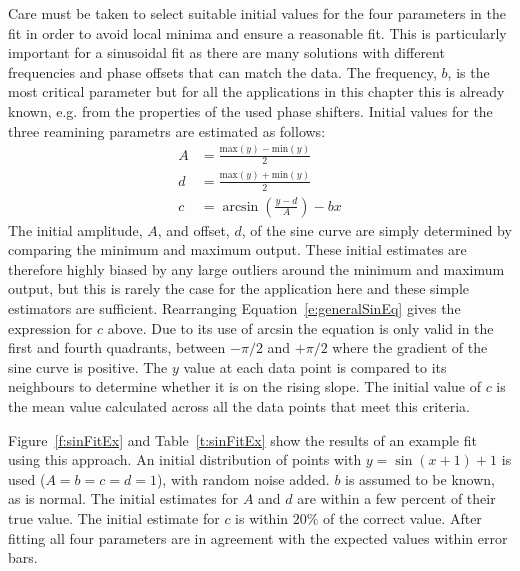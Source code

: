 Care must be taken to select suitable initial values for the four parameters in the fit in order to avoid local minima and ensure a reasonable fit. This is particularly important for a sinusoidal fit as there are many solutions with different frequencies and phase offsets that can match the data. The frequency, \(b\), is the most critical parameter but for all the applications in this chapter this is already known, e.g. from the properties of the used phase shifters. Initial values for the three reamining parametrs are estimated as follows:
\begin{align}
A &= \frac{\mathrm{max}(y)-\mathrm{min}(y)}{2} \\
d &= \frac{\mathrm{max}(y)+\mathrm{min}(y)}{2} \\
c &= \arcsin\left(\frac{y-d}{A}\right) - bx
\end{align}
The initial amplitude, \(A\), and offset, \(d\), of the sine curve are simply determined by comparing the minimum and maximum output. These initial estimates are therefore highly biased by any large outliers around the minimum and maximum output, but this is rarely the case for the application here and these simple estimators are sufficient.
Rearranging Equation~\ref{e:generalSinEq} gives the expression for \(c\) above. Due to its use of arcsin the equation is only valid in the first and fourth quadrants, between \(-\pi/2\) and \(+\pi/2\) where the gradient of the sine curve is positive. The \(y\) value at each data point is compared to its neighbours to determine whether it is on the rising slope. The initial value of \(c\) is the mean value calculated across all the data points that meet this criteria.

Figure~\ref{f:sinFitEx} and Table~\ref{t:sinFitEx} show the results of an example fit using this approach. An initial distribution of points with \(y=\sin(x+1)+1\) is used (\(A = b = c = d = 1\)), with random noise added. \(b\) is assumed to be known, as is normal. The initial estimates for \(A\) and \(d\) are within a few percent of their true value. The initial estimate for \(c\) is within \(20\%\) of the correct value. After fitting all four parameters are in agreement with the expected values within error bars.

